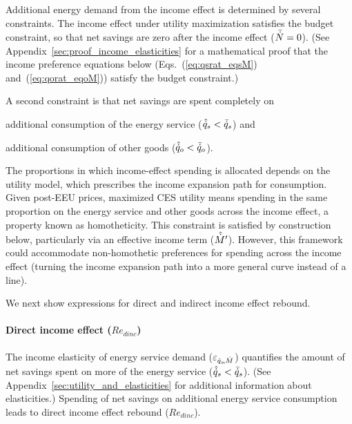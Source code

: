 \documentclass[12pt]{article}\usepackage[]{graphicx}\usepackage[]{xcolor}
\begin{document}
Additional energy demand from the income effect
is determined by several constraints.
The income effect under utility maximization
satisfies the budget constraint, so that
net savings are zero after
the income effect ($\bar{\dot{N}} = 0$).
(See Appendix~\ref{sec:proof_income_elasticities}
for a mathematical proof that the income preference equations below
(Eqs.~(\ref{eq:qsrat_eqsM}) and~(\ref{eq:qorat_eqoM}))
satisfy the budget constraint.)

A second constraint is that net savings are spent completely on
%
\begin{enumerate*}[label={(\roman*)}]
	
  \item additional consumption of the energy service ($\hat{\dot{q}}_s < \bar{\dot{q}}_s$) and
  
  \item additional consumption of other goods ($\hat{\dot{q}}_o < \bar{\dot{q}}_o$).
    
\end{enumerate*}
%
The proportions in which income-effect spending is allocated
depends on the utility model, 
which prescribes the income expansion path for consumption. 
Given post-EEU prices, maximized CES utility 
means spending in the same proportion on the energy service and other goods 
across the income effect, 
a property known as homotheticity.
This constraint is satisfied by construction below, 
particularly via an effective income term ($\hat{\dot{M}}^\prime$).
However, this framework could accommodate non-homothetic preferences
for spending across the income effect (turning the income
expansion path into a more general curve instead of a line).

We next show expressions for 
direct and indirect income effect rebound.


\paragraph{Direct income effect ($Re_{dinc}$)} 
\label{sec:direct_income_effect}

The income elasticity of energy service demand ($\varepsilon_{\dot{q}_s\!,\dot{M}}$)
quantifies the amount of net savings spent 
on more of the energy service ($\hat{\dot{q}}_s < \bar{\dot{q}}_s$).
(See Appendix~\ref{sec:utility_and_elasticities} 
for additional information about elasticities.)
Spending of net savings on additional energy service consumption
leads to direct income effect rebound ($Re_{dinc}$).
\end{document}
